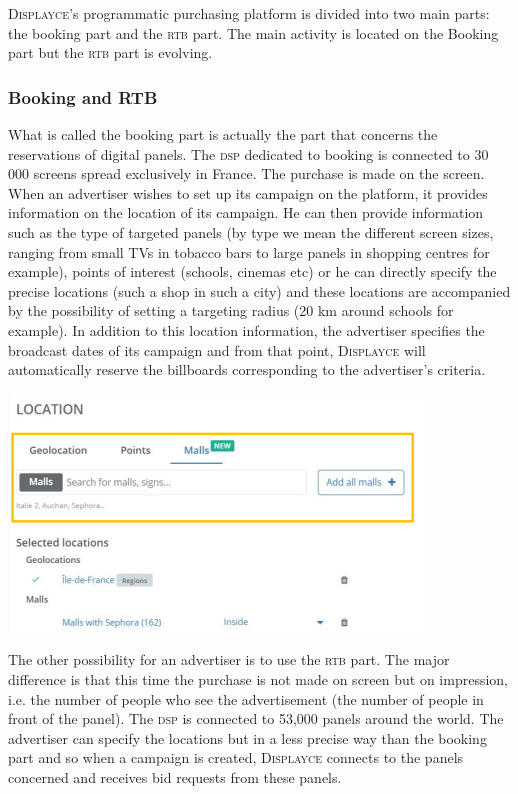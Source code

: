 \documentclass[12pt]{article}
\newcommand{\disp}{\textsc{Displayce}\xspace}
\begin{document}
\disp's programmatic purchasing platform is divided into two main parts: the booking part and the \textsc{rtb} part. The main activity is located on the Booking part but the \textsc{rtb} part is evolving. 

\subsubsection{Booking and RTB}

What is called the booking part is actually the part that concerns the reservations of digital panels. The \textsc{dsp} dedicated to booking is connected to 30 000 screens spread exclusively in France. The purchase is made on the screen. When an advertiser wishes to set up its campaign on the platform, it provides information on the location of its campaign. He can then provide information such as the type of targeted panels (by type we mean the different screen sizes, ranging from small TVs in tobacco bars to large panels in shopping centres for example), points of interest (schools, cinemas etc) or he can directly specify the precise locations (such a shop in such a city) and these locations are accompanied by the possibility of setting a targeting radius (20 km around schools for example). In addition to this location information, the advertiser specifies the broadcast dates of its campaign and from that point, \disp will automatically reserve the billboards corresponding to the advertiser's criteria. \\

\begin{center}
\includegraphics[scale=0.7]{Graphs/booking_example.png}
\end{center}

The other possibility for an advertiser is to use the \textsc{rtb} part. The major difference is that this time the purchase is not made on screen but on impression, i.e. the number of people who see the advertisement (the number of people in front of the panel). The \textsc{dsp} is connected to 53,000 panels around the world. The advertiser can specify the locations but in a less precise way than the booking part and so when a campaign is created, \disp connects to the panels concerned and receives bid requests from these panels. 
\end{document}
